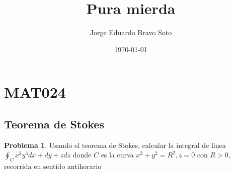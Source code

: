 \documentclass{article}
\title{Pura mierda}
\author{Jorge Eduardo Bravo Soto}
\date{\today}
\theoremstyle{definition}
\newtheorem{problem}{Problema}
\begin{document}
\maketitle
\tableofcontents

\section{MAT024}
\subsection{Teorema de Stokes}
\begin{problem}
Usando el teorema de Stokes, calcular la integral de linea $\oint_{C} x^{2}y^{3} dx + dy + z dz$ donde $C$ es la curva $x^{2} + y^{2} = R^{2}, z = 0$ con $R > 0$, recorrida en sentido antihorario
\end{problem}
\end{document}
